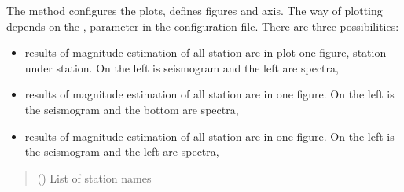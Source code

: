 \documentclass[letterpaper,10pt,english]{sphinxmanual}
\begin{document}
\begin{fulllineitems}
\begin{fulllineitems}
\begin{quote}
\begin{description}
\end{description}\end{quote}

\end{fulllineitems}


\begin{fulllineitems}
\label{\detokenize{api_support:amw.mw.plot.PlotMw.start_plot}}
\pysigstartsignatures
{}
\pysigstopsignatures
\sphinxAtStartPar
The method configures the plots, defines figures and axis. The way of plotting depends
on the ,  parameter in the configuration file.
There are three possibilities:
\begin{itemize}
\item {} 
\sphinxAtStartPar
{} \sphinxhyphen{} results of magnitude estimation of all station are in plot one figure,
station under station. On the left is seismogram and the left are spectra,

\item {} 
\sphinxAtStartPar
{} \sphinxhyphen{} results of magnitude estimation of all station are in one figure.
On the left is the seismogram and the bottom are spectra,

\item {} 
\sphinxAtStartPar
{} \sphinxhyphen{} results of magnitude estimation of all station are in one figure.
On the left is the seismogram and the left are spectra,

\end{itemize}
\begin{quote}\begin{description}
\sphinxAtStartPar
{} (\sphinxstyleliteralemphasis{\sphinxupquote{(}}\sphinxstyleliteralemphasis{\sphinxupquote{)}}) \textendash{} List of station names

\end{description}\end{quote}

\end{fulllineitems}


\end{fulllineitems}
\end{document}
